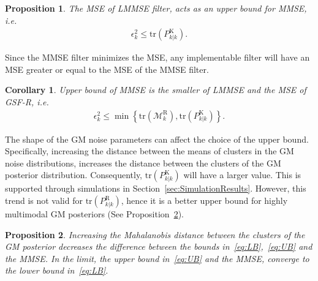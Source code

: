 \documentclass[10pt,twocolumn,twoside]{IEEEtran}
\newtheorem{corol}{Corollary}
\newtheorem{Prop}{Proposition}
\begin{document}
\begin{Prop}
\label{prop:KalUL}
The MSE of LMMSE filter, acts as an upper bound for MMSE, i.e.
\begin{align}
\epsilon_k ^{2} \leq \mathrm{tr}{\left(P_{k|k}^{\mathrm{K}}\right)}.
\end{align}
\end{Prop}
\begin{IEEEproof}
Since the MMSE filter minimizes the MSE, any implementable filter will have an MSE greater or equal to the MSE of the MMSE filter.
\end{IEEEproof}
\begin{corol}
Upper bound of MMSE is the smaller of LMMSE and the MSE of GSF-R, i.e.
\begin{align}
\label{eq:CombinedUL}
\epsilon_k ^{2} \leq \min{\left\lbrace\mathrm{tr}{\left(\mathcal{M}^{\mathrm{R}}_k\right)}, \mathrm{tr}{\left(P_{k|k}^{\mathrm{K}}\right)}\right\rbrace}.
\end{align}
\end{corol}
The shape of the GM noise parameters can affect the choice of the upper bound. Specifically, increasing the distance between the means of clusters in the GM noise distributions, increases the distance between the clusters of the GM posterior distribution. Consequently, \(\mathrm{tr}{\left(P_{k|k}^{\mathrm{K}}\right)}\) will have a larger value. This is supported through simulations in Section~\ref{sec:SimulationResults}. However, this trend is not valid for \(\mathrm{tr}{\left(P_{k|k}^{\mathrm{R}}\right)}\), hence it is a better upper bound for highly multimodal GM posteriors (See Proposition~\ref{prop:ConvergenceofBounds}).
\begin{Prop}
\label{prop:ConvergenceofBounds}
Increasing the Mahalanobis distance between the clusters of the GM posterior decreases the difference between the bounds in~\eqref{eq:LB},~\eqref{eq:UB} and the MMSE. In the limit, the upper bound in~\eqref{eq:UB} and the MMSE, converge to the lower bound in~\eqref{eq:LB}.
\end{Prop}
\end{document}
